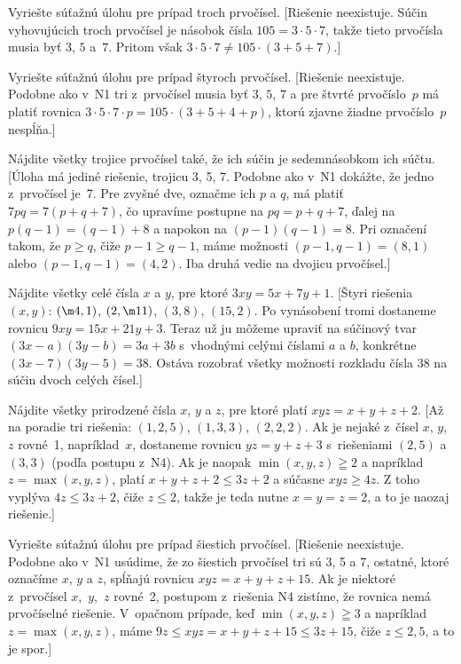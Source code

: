 {
Vyriešte súťažnú úlohu pre prípad troch prvočísel.
[Riešenie neexistuje. Súčin vyhovujúcich troch prvočísel je násobok čísla
$105=3\cdot 5 \cdot 7$, takže tieto prvočísla musia byť $3$, $5$ a~$7$.
Pritom však $3\cdot 5\cdot7\ne105\cdot(3+5+7)$.]

Vyriešte súťažnú úlohu pre prípad štyroch prvočísel.
[Riešenie neexistuje. Podobne ako v~N1 tri z~prvočísel musia byť $3$, $5$, $7$
a pre štvrté prvočíslo~$p$ má platiť rovnica
$3\cdot5\cdot 7\cdot p=105\cdot(3+5+4+p)$, ktorú zjavne žiadne prvočíslo~$p$
nespĺňa.]

Nájdite všetky trojice prvočísel také, že ich
súčin je sedemnásobkom ich súčtu.
[Úloha má jediné riešenie, trojicu 3, 5, 7. Podobne ako v~N1 dokážte,
že jedno z~prvočísel je~7. Pre zvyšné dve, označme ich $p$ a $q$,
má platiť $7pq=7(p+q+7)$,
čo upravíme postupne na $pq=p+q+7$, ďalej na $p(q-1)=(q-1)+8$
a napokon na $(p-1)(q-1)=8$. Pri označení takom, že $p \ge q$,
čiže $p-1 \ge q-1$, máme možnosti $(p-1,q-1)=(8,1)$ alebo
$(p-1,q-1)=(4,2)$. Iba druhá vedie na dvojicu prvočísel.]

Nájdite všetky celé čísla $x$ a $y$, pre ktoré $3xy=5x+7y+1$.
[Štyri riešenia $(x,y)$: $(\m4,1)$, $(2,\m11)$, $(3,8)$, $(15,2)$.
Po vynásobení tromi dostaneme rovnicu $9xy=15x+21y+3$. Teraz už ju môžeme
upraviť na súčinový tvar $(3x-a)(3y-b)=3a+3b$ s~vhodnými celými
číslami $a$ a $b$, konkrétne $(3x-7)(3y-5)=38$. Ostáva rozobrať všetky
možnosti rozkladu čísla 38 na súčin dvoch celých čísel.]


Nájdite všetky prirodzené čísla $x$, $y$ a $z$, pre ktoré platí
$xyz=x+y+z+2$.
[Až na poradie tri riešenia: $(1,2,5)$, $(1,3,3)$, $(2,2,2)$.
Ak je nejaké z~čísel $x$, $y$, $z$ rovné~1, napríklad~$x$,
dostaneme rovnicu $yz=y+z+3$ s~riešeniami $(2,5)$ a $(3,3)$
(podľa postupu z~N4). Ak je naopak $\min(x,y,z)\geqq2$ a
napríklad $z=\max(x,y,z)$, platí
$x+y+z+2\le 3z+2$ a súčasne $xyz \ge 4z$. Z toho vyplýva
$4z\le 3z+2$, čiže $z \le 2$, takže je teda nutne
$x=y=z=2$, a to je naozaj riešenie.]

\D
Vyriešte súťažnú úlohu pre prípad šiestich prvočísel.
[Riešenie neexistuje. Podobne ako v~N1 usúdime, že zo šiestich
prvočísel tri sú 3, 5 a 7, ostatné,
ktoré označíme $x$, $y$ a $z$, spĺňajú rovnicu
$xyz=x+y+z+15$. Ak je niektoré z~prvočísel $x$,~$y$,~$z$ rovné~2,
postupom z~riešenia N4 zistíme, že rovnica nemá prvočíselné riešenie.
V~opačnom prípade, keď $\min(x,y,z)\geqq3$ a napríklad
$z=\max(x,y,z)$, máme $9z \leq xyz=x+y+z+15\leq 3z+15$, čiže
$z\leq 2{,}5$, a to je spor.]

}
